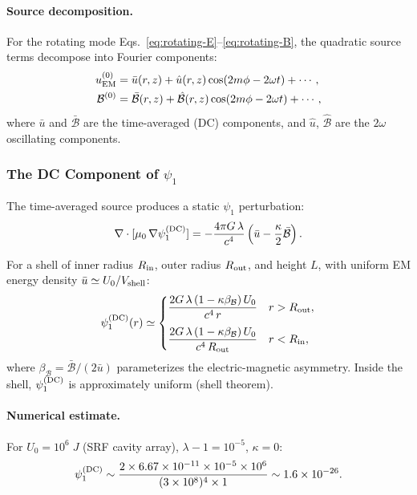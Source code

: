 \documentclass[aps,prd,twocolumn,superscriptaddress,floatfix,nofootinbib]{revtex4-2}
\newcommand{\mufunction}{\mu}
\newcommand{\lam}{\lambda}
\newcommand{\kap}{\kappa}
\newcommand{\calB}{\mathcal{B}}
\begin{document}
\paragraph{Source decomposition.} For the rotating mode
Eqs.~\eqref{eq:rotating-E}--\eqref{eq:rotating-B}, the quadratic
source terms decompose into Fourier components:
\begin{align}
u_{\rm EM}^{(0)} &= \bar{u}(r,z) + \hat{u}(r,z)\cos(2m\phi - 2\omega t)
+ \cdots, \label{eq:uEM-decomp}\\
\calB^{(0)} &= \bar{\calB}(r,z) + \hat{\calB}(r,z)\cos(2m\phi - 2\omega t)
+ \cdots, \label{eq:calB-decomp}
\end{align}
where $\bar{u}$ and $\bar{\calB}$ are the time-averaged (DC) components,
and $\hat{u}$, $\hat{\calB}$ are the $2\omega$ oscillating components.

\subsubsection{The DC Component of $\psi_1$}

The time-averaged source produces a static $\psi_1$ perturbation:
\begin{equation}
\nabla\cdot[\mufunction_0\,\nabla\psi_1^{(\rm DC)}]
= -\frac{4\pi G\,\lam}{c^4}
\left(\bar{u} - \frac{\kap}{2}\bar{\calB}\right).
\label{eq:psi1-DC}
\end{equation}

For a shell of inner radius $R_{\rm in}$, outer radius $R_{\rm out}$,
and height $L$, with uniform EM energy density
$\bar{u} \simeq U_0/V_{\rm shell}$:
\begin{equation}
\psi_1^{(\rm DC)}(r) \simeq
\begin{cases}
\displaystyle\frac{2G\,\lam\,(1-\kap\beta_\calB)\,U_0}{c^4\,r}
& r > R_{\rm out}, \\[10pt]
\displaystyle\frac{2G\,\lam\,(1-\kap\beta_\calB)\,U_0}{c^4\,R_{\rm out}}
& r < R_{\rm in},
\end{cases}
\label{eq:psi1-DC-explicit}
\end{equation}
where $\beta_\calB = \bar{\calB}/(2\bar{u})$ parameterizes the
electric-magnetic asymmetry. Inside the shell, $\psi_1^{(\rm DC)}$ is
approximately uniform (shell theorem).

\paragraph{Numerical estimate.} For $U_0 = 10^6\;\si{J}$ (SRF cavity
array), $\lam - 1 = 10^{-5}$, $\kap = 0$:
\begin{equation}
\psi_1^{(\rm DC)} \sim \frac{2 \times 6.67\times10^{-11}
\times 10^{-5} \times 10^6}{(3\times10^8)^4 \times 1}
\sim 1.6 \times 10^{-26}.
\label{eq:psi1-numerical}
\end{equation}
\end{document}
